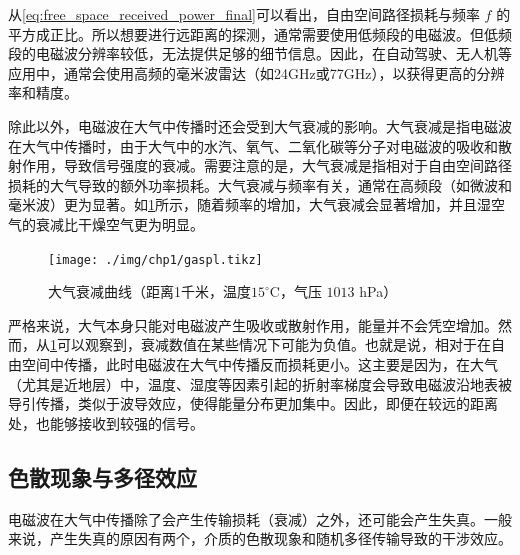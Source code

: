 从\cref{eq:free_space_received_power_final}可以看出，自由空间路径损耗与频率 $f$ 的平方成正比。所以想要进行远距离的探测，通常需要使用低频段的电磁波。但低频段的电磁波分辨率较低，无法提供足够的细节信息。因此，在自动驾驶、无人机等应用中，通常会使用高频的毫米波雷达（如24GHz或77GHz），以获得更高的分辨率和精度。

除此以外，电磁波在大气中传播时还会受到大气衰减的影响。大气衰减是指电磁波在大气中传播时，由于大气中的水汽、氧气、二氧化碳等分子对电磁波的吸收和散射作用，导致信号强度的衰减。需要注意的是，大气衰减是指相对于自由空间路径损耗的大气导致的额外功率损耗。大气衰减与频率有关，通常在高频段（如微波和毫米波）更为显著。如\cref{fig_chp1_gaspl}所示，随着频率的增加，大气衰减会显著增加，并且湿空气的衰减比干燥空气更为明显。

\begin{figure}[htb!]
    \centering
    \texttt{[image: ./img/chp1/gaspl.tikz]}
    \caption{大气衰减曲线（距离1千米，温度$15^\circ$C，气压 $1013$ hPa）}
    \label{fig_chp1_gaspl}
\end{figure}

严格来说，大气本身只能对电磁波产生吸收或散射作用，能量并不会凭空增加。然而，从\cref{fig_chp1_gaspl}可以观察到，衰减数值在某些情况下可能为负值。也就是说，相对于在自由空间中传播，此时电磁波在大气中传播反而损耗更小。这主要是因为，在大气（尤其是近地层）中，温度、湿度等因素引起的折射率梯度会导致电磁波沿地表被导引传播，类似于波导效应，使得能量分布更加集中。因此，即便在较远的距离处，也能够接收到较强的信号。

\subsection{色散现象与多径效应}
电磁波在大气中传播除了会产生传输损耗（衰减）之外，还可能会产生失真。一般来说，产生失真的原因有两个，介质的色散现象和随机多径传输导致的干涉效应。

